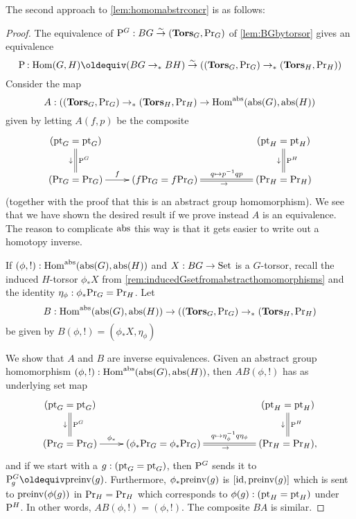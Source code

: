 \label{sec:absconctorsor}

The second approach to \cref{lem:homomabstrconcr} is as follows:


\begin{proof}
  The equivalence of $\mathrm{P}_{\!}^G:BG\overset\sim\to(\mathbf{Tors}_G,\mathrm{Pr}_{{G}})$ of \cref{lem:BGbytorsor} gives an equivalence
$$\pathsp{}:\Hom(G,H)\oldequiv (BG\to_*BH)\we((\typetorsor_G,\princ G)\to_*(\typetorsor_H,\princ H))
$$
Consider the map
$$A:((\mathbf{Tors}_G,\mathrm{Pr}_{{G}})\to_*(\mathbf{Tors}_H,\mathrm{Pr}_{{H}})\to \mathrm{Hom}^{\mathrm{abs}}(\mathrm{abs}(G),\mathrm{abs}(H))$$
given by letting $A(f,p)$ be the composite 
$$\xymatrix{(\pt_G=\pt_G)\ar@{=}[d]^{\pathsp{}^G}_\downarrow&&&
  (\pt_H=\pt_H)\ar@{=}[d]^{\pathsp{}^H}_\downarrow\\
  (\princ G=\princ G)\ar[r]^-f&
  (f\princ G=f\princ G)\ar@{=}[rr]^-{q\mapsto p^{-1}qp}_\to&&
  (\princ H=\princ H)
}$$
(together with the proof that this is an abstract group homomorphism).  We see that we have shown the desired result if we prove instead $A$ is an equivalence.  The reason to complicate $\mathrm{abs}$ this way is that it gets easier to write out a homotopy inverse.

If $(\phi,!):\mathrm{Hom}^{\mathrm{abs}}(\mathrm{abs}(G),\mathrm{abs}(H))$ and $X:BG\to\mathord{\mathrm{Set}}$ is a $G$-torsor, recall the induced $H$-torsor $\phi_*X$ from \cref{rem:inducedGsetfromabstracthomomorphisms} and the identity $\eta_\phi:\phi_*\mathrm{Pr}_{{G}}=\mathrm{Pr}_{{H}}$. 
Let 
$$B: \mathrm{Hom}^{\mathrm{abs}}(\mathrm{abs}(G),\mathrm{abs}(H))\to ((\mathbf{Tors}_G,\mathrm{Pr}_{{G}})\to_*(\mathbf{Tors}_H,\mathrm{Pr}_{{H}})$$
be given by $B(\phi,!)=(\phi_*X,\eta_\phi)$

We show that $A$ and $B$ are inverse equivalences.  Given an abstract group homomorphism $(\phi,!):\mathrm{Hom}^{\mathrm{abs}}(\mathrm{abs}(G),\mathrm{abs}(H))$, then $AB(\phi,!)$ has as underlying set map
$$\xymatrix{(\pt_G=\pt_G)\ar@{=}[d]^{\pathsp{}^G}_\downarrow&&&
  (\pt_H=\pt_H)\ar@{=}[d]^{\pathsp{}^H}_\downarrow\\
  (\princ G=\princ G)\ar[r]^-{\phi_*}&
  (\phi_*\princ G=\phi_*\princ G)\ar@{=}[rr]^-{q\mapsto \eta_\phi^{-1}q\eta_\phi}_\to&&
  (\princ H=\princ H),
}$$
and if we start with a $g:(\mathrm{pt}_G=\mathrm{pt}_G)$, then $\mathrm{P}_{\!}^G$ sends it to $\pathsp g^G\oldequiv\preinv (g)$.  Furthermore, $\phi_*\mathrm{preinv} (g)$ is $[\mathord{\mathrm{id}},\mathrm{preinv} (g)]$ which is sent to $\mathrm{preinv} (\phi(g))$ in $\mathrm{Pr}_{{H}}=\mathrm{Pr}_{{H}}$ which corresponds to $\phi(g):(\mathrm{pt}_H=\mathrm{pt}_H)$ under $\mathrm{P}_{\!}^H$.  In other words, $AB(\phi,!)=(\phi,!)$.  The composite $BA$ is similar.
\end{proof}


